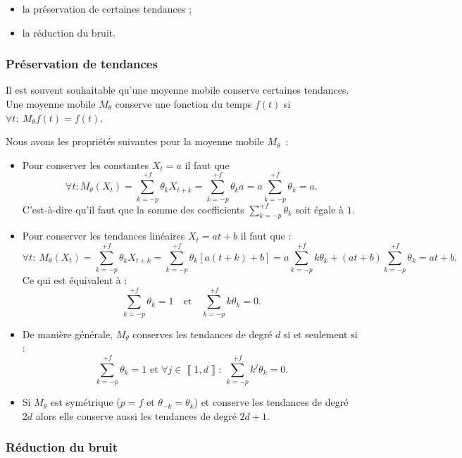 \documentclass[
  12pt,
  a4paper,french]{article}
\newcommand\1{\mathds{1}}
\begin{document}
\begin{itemize}
\item
  la préservation de certaines tendances ;
\item
  la réduction du bruit.
\end{itemize}

\hypertarget{pruxe9servation-de-tendances}{%
\subsubsection{Préservation de tendances}\label{pruxe9servation-de-tendances}}

Il est souvent souhaitable qu'une moyenne mobile conserve certaines tendances.
Une moyenne mobile \(M_\theta\) conserve une fonction du temps \(f(t)\) si \(\forall t:\:M_\theta f(t)=f(t)\).

Nous avons les propriétés suivantes pour la moyenne mobile \(M_\theta\)~:

\begin{itemize}
\item
  Pour conserver les constantes \(X_t=a\) il faut que
  \[
  \forall t:M_\theta(X_t)=\sum_{k=-p}^{+f}\theta_kX_{t+k}=\sum_{k=-p}^{+f}\theta_ka=a\sum_{k=-p}^{+f}\theta_k=a.
  \]
  C'est-à-dire qu'il faut que la somme des coefficients \(\sum_{k=-p}^{+f}\theta_k\) soit égale à \(1\).
\item
  Pour conserver les tendances linéaires \(X_t=at+b\) il faut que :
  \[
  \forall t:\:M_\theta(X_t)=\sum_{k=-p}^{+f}\theta_kX_{t+k}=\sum_{k=-p}^{+f}\theta_k[a(t+k)+b]=a\sum_{k=-p}^{+f}k\theta_k+(at+b)\sum_{k=-p}^{+f}\theta_k=at+b.
  \]
  Ce qui est équivalent à :
  \[
  \sum_{k=-p}^{+f}\theta_k=1
  \quad\text{et}\quad
  \sum_{k=-p}^{+f}k\theta_k=0.
  \]
\item
  De manière générale, \(M_\theta\) conserves les tendances de degré \(d\) si et seulement si :
  \[
  \sum_{k=-p}^{+f}\theta_k=1
   \text{ et }
  \forall j \in \left\llbracket 1,d\right\rrbracket:\:
  \sum_{k=-p}^{+f}k^j\theta_k=0.
  \]
\item
  Si \(M_\theta\) est symétrique (\(p=f\) et \(\theta_{-k} = \theta_k\)) et conserve les tendances de degré \(2d\) alors elle conserve aussi les tendances de degré \(2d+1\).
\end{itemize}

\hypertarget{ruxe9duction-du-bruit}{%
\subsubsection{Réduction du bruit}\label{ruxe9duction-du-bruit}}
\end{document}
